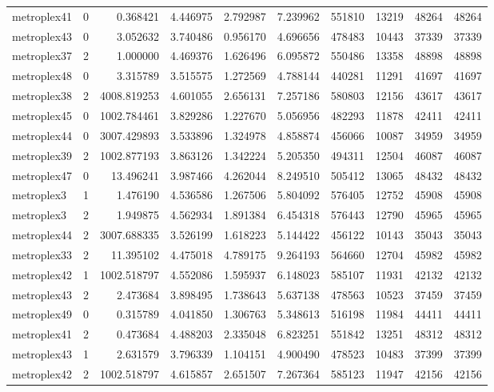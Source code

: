 \documentclass[../../../thesis.tex]{subfiles}
\begin{document}
\begin{longtable}{|l|r|r|r|r|r|r|r|r|r|}
metroplex41 & 0 & 0.368421 & 4.446975 & 2.792987 & 7.239962 & 551810 & 13219 & 48264 & 48264 \\
metroplex43 & 0 & 3.052632 & 3.740486 & 0.956170 & 4.696656 & 478483 & 10443 & 37339 & 37339 \\
metroplex37 & 2 & 1.000000 & 4.469376 & 1.626496 & 6.095872 & 550486 & 13358 & 48898 & 48898 \\
metroplex48 & 0 & 3.315789 & 3.515575 & 1.272569 & 4.788144 & 440281 & 11291 & 41697 & 41697 \\
metroplex38 & 2 & 4008.819253 & 4.601055 & 2.656131 & 7.257186 & 580803 & 12156 & 43617 & 43617 \\
metroplex45 & 0 & 1002.784461 & 3.829286 & 1.227670 & 5.056956 & 482293 & 11878 & 42411 & 42411 \\
metroplex44 & 0 & 3007.429893 & 3.533896 & 1.324978 & 4.858874 & 456066 & 10087 & 34959 & 34959 \\
metroplex39 & 2 & 1002.877193 & 3.863126 & 1.342224 & 5.205350 & 494311 & 12504 & 46087 & 46087 \\
metroplex47 & 0 & 13.496241 & 3.987466 & 4.262044 & 8.249510 & 505412 & 13065 & 48432 & 48432 \\
metroplex3 & 1 & 1.476190 & 4.536586 & 1.267506 & 5.804092 & 576405 & 12752 & 45908 & 45908 \\
metroplex3 & 2 & 1.949875 & 4.562934 & 1.891384 & 6.454318 & 576443 & 12790 & 45965 & 45965 \\
metroplex44 & 2 & 3007.688335 & 3.526199 & 1.618223 & 5.144422 & 456122 & 10143 & 35043 & 35043 \\
metroplex33 & 2 & 11.395102 & 4.475018 & 4.789175 & 9.264193 & 564660 & 12704 & 45982 & 45982 \\
metroplex42 & 1 & 1002.518797 & 4.552086 & 1.595937 & 6.148023 & 585107 & 11931 & 42132 & 42132 \\
metroplex43 & 2 & 2.473684 & 3.898495 & 1.738643 & 5.637138 & 478563 & 10523 & 37459 & 37459 \\
metroplex49 & 0 & 0.315789 & 4.041850 & 1.306763 & 5.348613 & 516198 & 11984 & 44411 & 44411 \\
metroplex41 & 2 & 0.473684 & 4.488203 & 2.335048 & 6.823251 & 551842 & 13251 & 48312 & 48312 \\
metroplex43 & 1 & 2.631579 & 3.796339 & 1.104151 & 4.900490 & 478523 & 10483 & 37399 & 37399 \\
metroplex42 & 2 & 1002.518797 & 4.615857 & 2.651507 & 7.267364 & 585123 & 11947 & 42156 & 42156 \\

\end{longtable}
\end{document}

